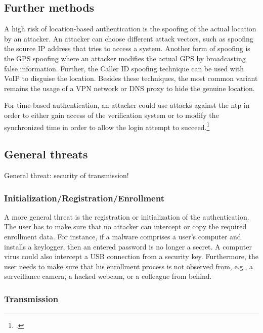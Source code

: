 \subsection{Further methods}

A high risk of location-based authentication is the spoofing of the actual location by an attacker. An attacker can choose different attack vectors, such as spoofing the source IP address that tries to access a system. Another form of spoofing is the GPS spoofing where an attacker modifies the actual GPS by broadcasting false information. Further, the Caller ID spoofing technique can be used with VoIP to disguise the location. Besides these techniques, the most common variant remains the usage of a VPN network or DNS proxy to hide the genuine location.

For time-based authentication, an attacker could use attacks against the \gls{ntp} in order to either gain access of the verification system or to modify the synchronized time in order to allow the login attempt to succeed.\footcite[See][]{malhotraattacking}

\subsection{General threats}

General threat: security of transmission!

\subsubsection{Initialization/Registration/Enrollment}

A more general threat is the registration or initialization of the authentication. The user has to make sure that no attacker can intercept or copy the required enrollment data. For instance, if a malware comprises a user’s computer and installs a keylogger, then an entered password is no longer a secret. A computer virus could also intercept a USB connection from a security key. Furthermore, the user needs to make sure that his enrollment process is not observed from, e.g., a surveillance camera, a hacked webcam, or a colleague from behind.

\subsubsection{Transmission}